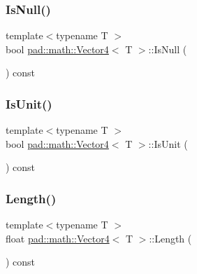\subsubsection{\texorpdfstring{Is\+Null()}{IsNull()}}
{\footnotesize\ttfamily template$<$typename T $>$ \\
bool \mbox{\hyperlink{structpad_1_1math_1_1_vector4}{pad\+::math\+::\+Vector4}}$<$ T $>$\+::Is\+Null (\begin{DoxyParamCaption}{ }\end{DoxyParamCaption}) const}

\mbox{\label{structpad_1_1math_1_1_vector4_a194b228f5e0d3d8171daaa78927a7bd3}} 
\subsubsection{\texorpdfstring{Is\+Unit()}{IsUnit()}}
{\footnotesize\ttfamily template$<$typename T $>$ \\
bool \mbox{\hyperlink{structpad_1_1math_1_1_vector4}{pad\+::math\+::\+Vector4}}$<$ T $>$\+::Is\+Unit (\begin{DoxyParamCaption}{ }\end{DoxyParamCaption}) const}

\mbox{\label{structpad_1_1math_1_1_vector4_ac374b52275efc5f8e8b988e347fc340e}} 
\subsubsection{\texorpdfstring{Length()}{Length()}}
{\footnotesize\ttfamily template$<$typename T $>$ \\
float \mbox{\hyperlink{structpad_1_1math_1_1_vector4}{pad\+::math\+::\+Vector4}}$<$ T $>$\+::Length (\begin{DoxyParamCaption}{ }\end{DoxyParamCaption}) const}

\mbox{\label{structpad_1_1math_1_1_vector4_ae79f5cf216a4270769bfb88a54d0541d}} 
